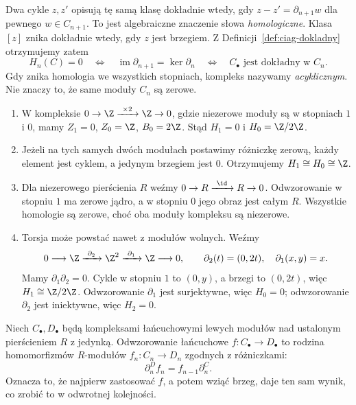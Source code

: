 Dwa cykle $z,z'$ opisują tę samą klasę dokładnie
wtedy, gdy $z-z'=\partial_{n+1}w$ dla pewnego
$w\in C_{n+1}$. To jest algebraiczne
znaczenie słowa \emph{homologiczne}.
Klasa $[z]$ znika dokładnie wtedy, gdy
$z$ jest brzegiem. Z Definicji~\ref{def:ciag-dokladny}
otrzymujemy zatem
\[
 H_n(C)=0
 \quad\Longleftrightarrow\quad
 \operatorname{im}\partial_{n+1}=\ker \partial_n
 \quad\Longleftrightarrow\quad
 C_\bullet\text{ jest dokładny w }C_n.
\]
Gdy znika homologia we wszystkich stopniach,
kompleks nazywamy \emph{acyklicznym}.
Nie znaczy to, że same moduły $C_n$ są zerowe.

\begin{przyklad}
\label{prz:homologia-rachunki}
\begin{enumerate}[leftmargin=*]
\item W kompleksie
      $0\to\Z\xrightarrow{\ \times2\ }\Z\to0$,
      gdzie niezerowe moduły są w stopniach
      $1$ i $0$, mamy $Z_1=0$, $Z_0=\Z$,
      $B_0=2\Z$. Stąd
      $H_1=0$ i $H_0=\Z/2\Z$.
\item Jeżeli na tych samych dwóch modułach
      postawimy różniczkę zerową, każdy element
      jest cyklem, a jedynym brzegiem jest $0$.
      Otrzymujemy $H_1\cong H_0\cong\Z$.
\item Dla niezerowego pierścienia $R$ weźmy
      $0\to R\xrightarrow{\ \id\ }R\to0$.
      Odwzorowanie w stopniu $1$ ma zerowe jądro,
      a w stopniu $0$ jego obraz jest całym $R$.
      Wszystkie homologie są zerowe, choć
      oba moduły kompleksu są niezerowe.
\item Torsja może powstać nawet z modułów
      wolnych. Weźmy
      \[
       0\longrightarrow\Z
       \xrightarrow{\ \partial_2\ }\Z^2
       \xrightarrow{\ \partial_1\ }\Z
       \longrightarrow0,\qquad
       \partial_2(t)=(0,2t),\quad \partial_1(x,y)=x.
      \]
      Mamy $\partial_1\partial_2=0$.
      Cykle w stopniu $1$ to $(0,y)$,
      a brzegi to $(0,2t)$, więc
      $H_1\cong\Z/2\Z$. Odwzorowanie $\partial_1$ jest
      surjektywne, więc $H_0=0$; odwzorowanie
      $\partial_2$ jest iniektywne, więc $H_2=0$.
\end{enumerate}
\end{przyklad}

\begin{definicja}
\label{def:mapa-lancuchowa}
Niech $C_\bullet,D_\bullet$ będą kompleksami
łańcuchowymi lewych modułów nad ustalonym
pierścieniem $R$ z jedynką.
Odwzorowanie łańcuchowe $f:C_\bullet\to D_\bullet$
to rodzina homomorfizmów $R$-modułów
$f_n:C_n\to D_n$ zgodnych
z różniczkami:
\begin{equation}\label{eq:mapa-lancuchowa}
 \partial^D_n f_n=f_{n-1}\partial^C_n.
\end{equation}
Oznacza to, że najpierw zastosować $f$,
a potem wziąć brzeg, daje ten sam wynik,
co zrobić to w odwrotnej kolejności.
\end{definicja}

